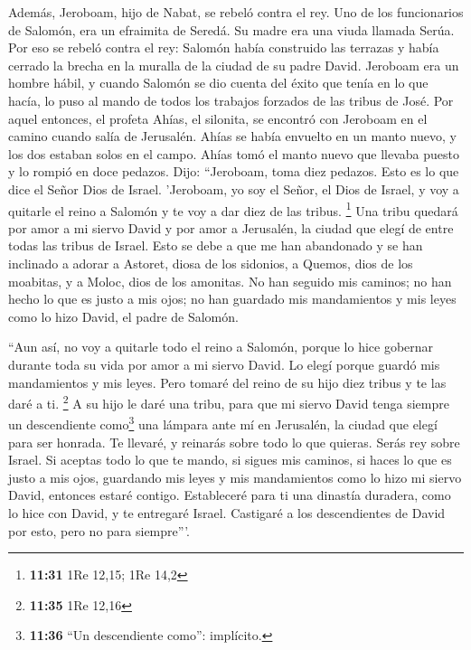  Además, Jeroboam, hijo de Nabat, se rebeló contra el
rey. Uno de los funcionarios de Salomón, era un efraimita de Seredá. Su
madre era una viuda llamada Serúa.  Por eso se rebeló
contra el rey: Salomón había construido las terrazas y había cerrado la
brecha en la muralla de la ciudad de su padre David. 
Jeroboam era un hombre hábil, y cuando Salomón se dio cuenta del éxito
que tenía en lo que hacía, lo puso al mando de todos los trabajos
forzados de las tribus de José.  Por aquel entonces, el
profeta Ahías, el silonita, se encontró con Jeroboam en el camino cuando
salía de Jerusalén.  Ahías se había envuelto en un manto
nuevo, y los dos estaban solos en el campo. Ahías tomó el manto nuevo
que llevaba puesto y lo rompió en doce pedazos.  Dijo:
``Jeroboam, toma diez pedazos. Esto es lo que dice el Señor Dios de
Israel. 'Jeroboam, yo soy el Señor, el Dios de Israel, y voy a quitarle
el reino a Salomón y te voy a dar diez de las tribus. \footnote{\textbf{11:31}
  1Re 12,15; 1Re 14,2}  Una tribu quedará por amor a mi
siervo David y por amor a Jerusalén, la ciudad que elegí de entre todas
las tribus de Israel.  Esto se debe a que me han
abandonado y se han inclinado a adorar a Astoret, diosa de los sidonios,
a Quemos, dios de los moabitas, y a Moloc, dios de los amonitas. No han
seguido mis caminos; no han hecho lo que es justo a mis ojos; no han
guardado mis mandamientos y mis leyes como lo hizo David, el padre de
Salomón.

 ``Aun así, no voy a quitarle todo el reino a Salomón,
porque lo hice gobernar durante toda su vida por amor a mi siervo David.
Lo elegí porque guardó mis mandamientos y mis leyes. 
Pero tomaré del reino de su hijo diez tribus y te las daré a ti.
\footnote{\textbf{11:35} 1Re 12,16}  A su hijo le daré
una tribu, para que mi siervo David tenga siempre un descendiente
como\footnote{\textbf{11:36} ``Un descendiente como'': implícito.} una
lámpara ante mí en Jerusalén, la ciudad que elegí para ser honrada.
 Te llevaré, y reinarás sobre todo lo que quieras. Serás
rey sobre Israel.  Si aceptas todo lo que te mando, si
sigues mis caminos, si haces lo que es justo a mis ojos, guardando mis
leyes y mis mandamientos como lo hizo mi siervo David, entonces estaré
contigo. Estableceré para ti una dinastía duradera, como lo hice con
David, y te entregaré Israel.  Castigaré a los
descendientes de David por esto, pero no para siempre'''.

